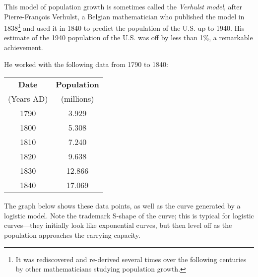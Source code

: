 This model of population growth is sometimes called the \textit{Verhulst model}, after Pierre-Fran\c cois Verhulst, a Belgian mathematician who published the model in 1838\footnote{It was rediscovered and re-derived several times over the following centuries by other mathematicians studying population growth.} and used it in 1840 to predict the population of the U.S. up to 1940.  His estimate of the 1940 population of the U.S. was off by less than 1\%, a remarkable achievement.

He worked with the following data from 1790 to 1840:
\begin{center}
\begin{tabular}{c | c}
\textbf{Date} & \textbf{Population}\\
(Years AD) & (millions)\\
\hline
1790 & 3.929\\
1800 & 5.308\\
1810 & 7.240\\
1820 & 9.638\\
1830 & 12.866\\
1840 & 17.069
\end{tabular}
\end{center}

The graph below shows these data points, as well as the curve generated by a logistic model.  Note the trademark S-shape of the curve; this is typical for logistic curves---they initially look like exponential curves, but then level off as the population approaches the carrying capacity.
\begin{center}
\end{center}

